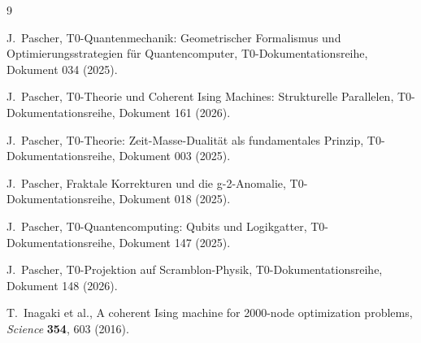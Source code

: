 \begin{thebibliography}{9}

J.~Pascher,
\newblock T0-Quantenmechanik: Geometrischer Formalismus und Optimierungsstrategien
für Quantencomputer,
\newblock T0-Dokumentationsreihe, Dokument 034 (2025).

J.~Pascher,
\newblock T0-Theorie und Coherent Ising Machines: Strukturelle Parallelen,
\newblock T0-Dokumentationsreihe, Dokument 161 (2026).

J.~Pascher,
\newblock T0-Theorie: Zeit-Masse-Dualität als fundamentales Prinzip,
\newblock T0-Dokumentationsreihe, Dokument 003 (2025).

J.~Pascher,
\newblock Fraktale Korrekturen und die g-2-Anomalie,
\newblock T0-Dokumentationsreihe, Dokument 018 (2025).

J.~Pascher,
\newblock T0-Quantencomputing: Qubits und Logikgatter,
\newblock T0-Dokumentationsreihe, Dokument 147 (2025).

J.~Pascher,
\newblock T0-Projektion auf Scramblon-Physik,
\newblock T0-Dokumentationsreihe, Dokument 148 (2026).

T.~Inagaki et al.,
\newblock A coherent Ising machine for 2000-node optimization problems,
\newblock \emph{Science} \textbf{354}, 603 (2016).

\end{thebibliography}

